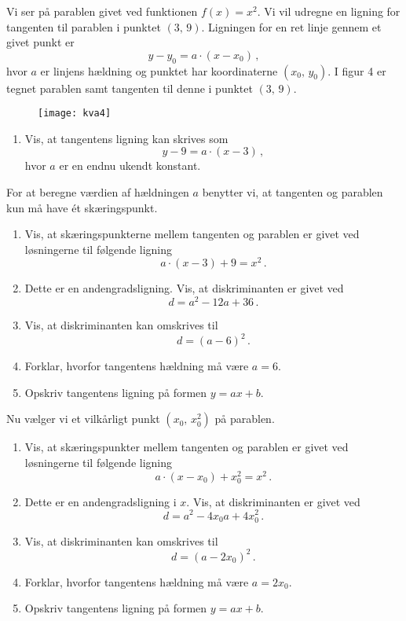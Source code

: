 \documentclass[12pt,oneside,a4paper]{article}
\theoremstyle{plain}
\begin{document}
Vi ser på parablen givet ved funktionen $f(x)=x^2$. Vi vil udregne en ligning 
for tangenten til parablen i punktet $(3,\, 9)$. Ligningen for en ret linje gennem
et givet punkt er 
\[
    y-y_0 = a\cdot (x-x_0) \,,
\]
hvor $a$ er linjens hældning og punktet har koordinaterne $(x_0,\, y_0)$.
I figur 4 er tegnet parablen samt tangenten til denne i punktet $(3,\, 9)$.

\begin{figure}[ht]
    \centering
    \texttt{[image: kva4]}
    \caption{}
    \label{fig4}
\end{figure}

\begin{enumerate}[label=(\alph*)]
    \item Vis, at tangentens ligning kan skrives som 
        \[
            y-9 = a\cdot(x-3)\,,
        \]
    hvor $a$ er en endnu ukendt konstant.
\end{enumerate}
For at beregne værdien af hældningen $a$ benytter vi, at tangenten og parablen
kun må have ét skæringspunkt.

\begin{enumerate}[label=(\alph*), resume]
    \item Vis, at skæringspunkterne mellem tangenten og parablen er givet
        ved løsningerne til følgende ligning
        \[
            a\cdot(x-3) + 9 = x^2 \,.
        \]
    \item Dette er en andengradsligning. Vis, at diskriminanten er givet ved
        \[
            d = a^2 - 12a + 36 \,.
        \]
    \item Vis, at diskriminanten kan omskrives til
        \[
            d = (a-6)^2 \,.
        \]
    \item Forklar, hvorfor tangentens hældning må være $a=6$.
    \item Opskriv tangentens ligning på formen $y=ax+b$.
\end{enumerate}

Nu vælger vi et vilkårligt punkt $(x_0,\, x_0^2)$ på parablen.
\begin{enumerate}[label=(\alph*), resume]
    \item Vis, at skæringspunkter mellem tangenten og parablen er givet
        ved løsningerne til følgende ligning
        \[
            a\cdot(x-x_0) + x_0^2 = x^2 \,.
        \]
    \item Dette er en andengradsligning i $x$. Vis, at diskriminanten er givet ved
        \[
            d = a^2 - 4x_0a + 4x_0^2 \,.
        \]
    \item Vis, at diskriminanten kan omskrives til
        \[
            d = (a-2x_0)^2 \,.
        \]
    \item Forklar, hvorfor tangentens hældning må være $a=2x_0$.
    \item Opskriv tangentens ligning på formen $y=ax+b$.
\end{enumerate}
\end{document}
